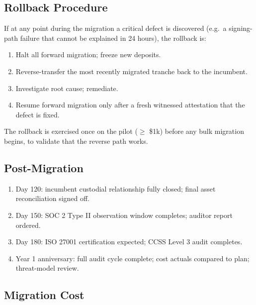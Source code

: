 \subsection{Rollback Procedure}

If at any point during the migration a critical defect is discovered
(e.g.\ a signing-path failure that cannot be explained in 24 hours),
the rollback is:

\begin{enumerate}[nosep]
\item Halt all forward migration; freeze new deposits.
\item Reverse-transfer the most recently migrated tranche back to
the incumbent.
\item Investigate root cause; remediate.
\item Resume forward migration only after a fresh witnessed
attestation that the defect is fixed.
\end{enumerate}

The rollback is exercised once on the pilot ($\geq$ \$1k) before any
bulk migration begins, to validate that the reverse path works.

\subsection{Post-Migration}

\begin{enumerate}[nosep]
\item Day 120: incumbent custodial relationship fully closed; final
asset reconciliation signed off.
\item Day 150: SOC 2 Type II observation window completes; auditor
report ordered.
\item Day 180: ISO 27001 certification expected; CCSS Level 3 audit
completes.
\item Year 1 anniversary: full audit cycle complete; cost actuals
compared to plan; threat-model review.
\end{enumerate}

\subsection{Migration Cost}

